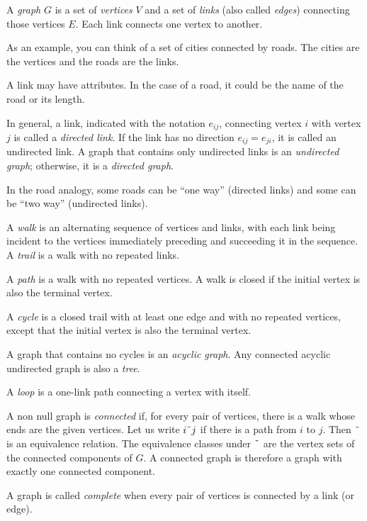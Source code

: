 \documentclass[justified, sixbynine]{tufte-book}
\theoremstyle{plain}%
\newtheorem * {corollary}{Corollary}
\theoremstyle{definition}
\theoremstyle{remark}
\newtheorem * {remark}{Remark}
\newtheorem * {note}{Note}
\begin{document}
\begin{fullwidth}
A {\it graph} $G$ is a set of {\it vertices} $V$ and a set of {\it links} (also called {\it edges}) connecting those vertices $E$. Each link connects one vertex to another.

As an example, you can think of a set of cities connected by roads. The cities are the vertices and the roads are the links.

A link may have attributes. In the case of a road, it could be the name of the road or its length.

In general, a link, indicated with the notation $e_{ij}$, connecting vertex $%
i $ with vertex $j$ is called a {\it directed link}. If the link has no
direction $e_{ij}=e_{ji}$, it is called an undirected link. A graph that
contains only undirected links is an {\it undirected graph}; otherwise, it is
a {\it directed graph}.

In the road analogy, some roads can be ``one way'' (directed links) and some can be ``two way'' (undirected links).

A {\it walk} is an alternating sequence of vertices and links, with each
link being incident to the vertices immediately preceding and succeeding it
in the sequence. A {\it trail} is a walk with no repeated links.

A {\it path} is a walk with no repeated vertices. A walk is closed if the
initial vertex is also the terminal vertex.

A {\it cycle} is a closed trail with at least one edge and with no repeated
vertices, except that the initial vertex is also the terminal vertex.

A graph that contains no cycles is an {\it acyclic graph}. Any connected
acyclic undirected graph is also a {\it tree}.


A {\it loop} is a one-link path connecting a vertex with itself.


A non null graph is {\it connected} if, for every pair of vertices, there is
a walk whose ends are the given vertices. Let us write $i%
\symbol{126}j$ if there is a path from $i$ to $j$. Then $\symbol{126}$ is an
equivalence relation. The equivalence classes under $\symbol{126}$ are the
vertex sets of the connected components of $G$. A connected graph is therefore
a graph with exactly one connected component.


A graph is called {\it complete} when every pair of vertices is connected by
a link (or edge).


\end{fullwidth}
\end{document}
